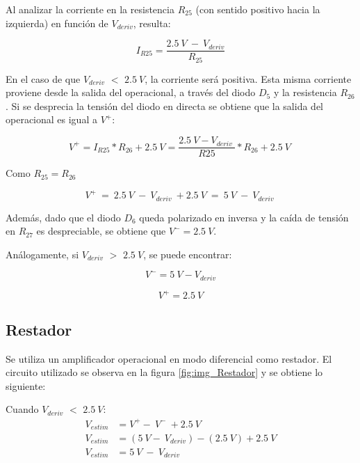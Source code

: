 \noindent Al analizar la corriente en la resistencia $R_{25}$ (con sentido positivo hacia la izquierda) en funci\'{o}n de $V_{deriv}$, resulta:

\begin{equation} \label{eq_corriente_r25}
	I_{R25}=\frac{2.5\:V\ -\ V_{deriv}}{R_{25}}
\end{equation}

\noindent En el caso de que $V_{deriv}$ $\mathrm{<}$ $2.5\:V$, la corriente ser\'{a} positiva. Esta misma corriente proviene desde la salida del operacional, a trav\'{e}s del diodo $D_5$ y la resistencia $R_{26}$. Si se desprecia la tensi\'{o}n del diodo en directa se obtiene que la salida del operacional es igual a $V^+$:

\begin{equation} \label{eq_V+}
	V^+=I_{R25}*R_{26}+2.5\:V=\frac{2.5\:V-V_{deriv}\ }{R25}*R_{26}+2.5\:V\ 
\end{equation} 

Como $R_{25}=R_{26}$

\begin{equation} \label{eq_V+_2}
	V^+\ =\ 2.5\:V\ -\ V_{deriv}\ +2.5\:V\ =\ 5\:V\ -\ V_{deriv}\ 
\end{equation}

Además, dado que el diodo $D_6$ queda polarizado en inversa y la caída de tensión en $R_{27}$ es despreciable, se obtiene que $V^- = 2.5\:V$.

An\'{a}logamente, si $V_{deriv}$ $\mathrm{>}$ $2.5\:V$, se puede encontrar:

\begin{equation} \label{eq_V+_3}
	V^- =5\:V-V_{deriv} 
\end{equation}

\begin{equation} 
	V^+ = 2.5\:V
\end{equation}


\subsection{Restador}

\noindent Se utiliza un amplificador operacional en modo diferencial como restador. El circuito utilizado se observa en la figura \ref{fig:img_Restador} y se obtiene lo siguiente:

\noindent Cuando $V_{deriv}$ $\mathrm{<}$ $2.5\:V$:
\begin{equation*} 
	\begin{aligned}
		V_{estim}&=V^+-\ V^-\ +2.5\:V\\ 
		V_{estim}&=(5\:V -\ V_{deriv})-(2.5\: V)+2.5\:V\\
		V_{estim}&=5\: V\ -\ V_{deriv}\\ 
	\end{aligned}
\end{equation*}


